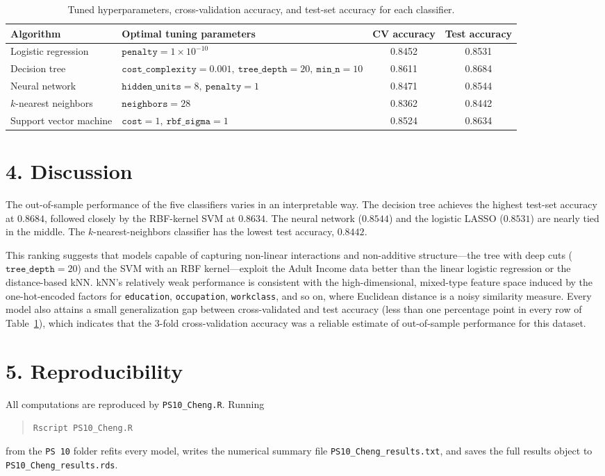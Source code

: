 \documentclass[11pt]{article}
\begin{document}
\begin{table}[h]
\centering
\caption{Tuned hyperparameters, cross-validation accuracy, and test-set accuracy for each classifier.}
\label{tab:results}
\begin{tabular}{l l c c}
\toprule
Algorithm & Optimal tuning parameters & CV accuracy & Test accuracy \\
\midrule
Logistic regression & \(\texttt{penalty} = 1 \times 10^{-10}\) & 0.8452 & 0.8531 \\
Decision tree       & \(\texttt{cost\_complexity} = 0.001,\ \texttt{tree\_depth} = 20,\ \texttt{min\_n} = 10\) & 0.8611 & 0.8684 \\
Neural network      & \(\texttt{hidden\_units} = 8,\ \texttt{penalty} = 1\) & 0.8471 & 0.8544 \\
$k$-nearest neighbors & \(\texttt{neighbors} = 28\) & 0.8362 & 0.8442 \\
Support vector machine & \(\texttt{cost} = 1,\ \texttt{rbf\_sigma} = 1\) & 0.8524 & 0.8634 \\
\bottomrule
\end{tabular}
\end{table}

\section*{4. Discussion}
The out-of-sample performance of the five classifiers varies in an interpretable way.
The decision tree achieves the highest test-set accuracy at \(0.8684\), followed closely by the RBF-kernel SVM at \(0.8634\).
The neural network (\(0.8544\)) and the logistic LASSO (\(0.8531\)) are nearly tied in the middle.
The $k$-nearest-neighbors classifier has the lowest test accuracy, \(0.8442\).

This ranking suggests that models capable of capturing non-linear interactions and non-additive structure---the tree with deep cuts (\(\texttt{tree\_depth} = 20\)) and the SVM with an RBF kernel---exploit the Adult Income data better than the linear logistic regression or the distance-based kNN.
kNN's relatively weak performance is consistent with the high-dimensional, mixed-type feature space induced by the one-hot-encoded factors for \texttt{education}, \texttt{occupation}, \texttt{workclass}, and so on, where Euclidean distance is a noisy similarity measure.
Every model also attains a small generalization gap between cross-validated and test accuracy (less than one percentage point in every row of Table~\ref{tab:results}), which indicates that the 3-fold cross-validation accuracy was a reliable estimate of out-of-sample performance for this dataset.

\section*{5. Reproducibility}
All computations are reproduced by \texttt{PS10\_Cheng.R}.
Running
\begin{quote}
\texttt{Rscript PS10\_Cheng.R}
\end{quote}
from the \texttt{PS~10} folder refits every model, writes the numerical summary file \texttt{PS10\_Cheng\_results.txt}, and saves the full results object to \texttt{PS10\_Cheng\_results.rds}.
\end{document}
